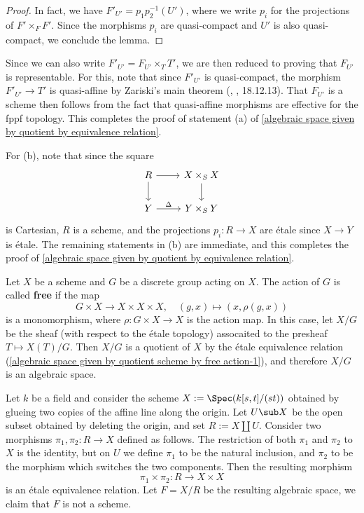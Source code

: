 \begin{proof}
In fact, we have $F'_{U'}=p_1p_2^{-1}(U')$, where we write $p_i$ for the projections of $F'\times_FF'$. Since the morphisms $p_i$ are quasi-compact and $U'$ is also quasi-compact, we conclude the lemma.
\end{proof}
Since we can also write $F'_{U'}=F_{U'}\times_TT'$, we are then reduced to proving that $F_{U'}$ is representable. For this, note that since $F'_{U'}$ is quasi-compact, the morphism $F'_{U'}\to T'$ is quasi-affine by Zariski's main theorem (\cite{EGA4}, , 18.12.13). That $F_{U'}$ is a scheme then follows from the fact that quasi-affine morphisms are effective for the fppf topology. This completes the proof of statement (a) of \cref{algebraic space given by quotient by equivalence relation}.\par
For (b), note that since the square
\[\begin{tikzcd}
R\ar[d]\ar[r]&X\times_SX\ar[d]\\
Y\ar[r,"\Delta"]&Y\times_SY
\end{tikzcd}\]
is Cartesian, $R$ is a scheme, and the projections $p_i:R\to X$ are \'etale since $X\to Y$ is \'etale. The remaining statements in (b) are immediate, and this completes the proof of \cref{algebraic space given by quotient by equivalence relation}.

\begin{example}\label{algebraic space given by quotient scheme by free action}
Let $X$ be a scheme and $G$ be a discrete group acting on $X$. The action of $G$ is called \textbf{free} if the map
\begin{equation}\label{algebraic space given by quotient scheme by free action-1}
G\times X\to X\times X\times X,\quad (g,x)\mapsto (x,\rho(g,x))
\end{equation}
is a monomorphism, where $\rho:G\times X\to X$ is the action map. In this case, let $X/G$ be the sheaf (with respect to the \'etale topology) assocaited to the presheaf $T\mapsto X(T)/G$. Then $X/G$ is a quotient of $X$ by the \'etale equivalence relation (\ref{algebraic space given by quotient scheme by free action-1}), and therefore $X/G$ is an algebraic space.
\end{example}

\begin{example}
Let $k$ be a field and consider the scheme $X:=\Spec(k[s,t]/(st))$ obtained by glueing two copies of the affine line along the origin. Let $U\sub X$ be the open subset obtained by deleting the origin, and set $R:=X\coprod U$. Consider two morphisms $\pi_1,\pi_2:R\to X$ defined as follows. The restriction of both $\pi_1$ and $\pi_2$ to $X$ is the identity, but on $U$ we define $\pi_1$ to be the natural inclusion, and $\pi_2$ to be the morphism which switches the two components. Then the resulting morphism
\[\pi_1\times\pi_2:R\to X\times X\]
is an \'etale equivalence relation. Let $F=X/R$ be the resulting algebraic space, we claim that $F$ is not a scheme. 
\end{example}

